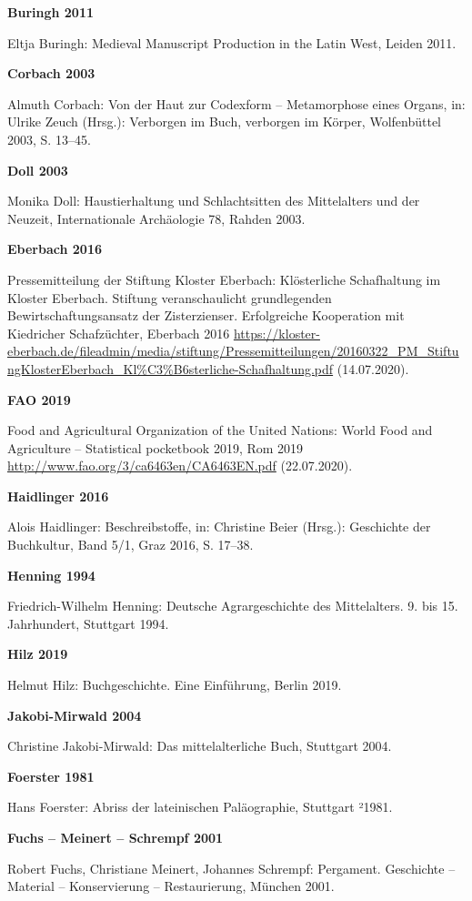 \documentclass[a4paper,
fontsize=11pt,
oneside,
numbers=noperiodatend,
parskip=half-,
bibliography=totoc,
final
]{scrartcl}
\begin{document}
\textbf{Buringh 2011}

Eltja Buringh: Medieval Manuscript Production in the Latin West, Leiden
2011.

\textbf{Corbach 2003}

Almuth Corbach: Von der Haut zur Codexform -- Metamorphose eines Organs,
in: Ulrike Zeuch (Hrsg.): Verborgen im Buch, verborgen im Körper,
Wolfenbüttel 2003, S. 13--45.

\textbf{Doll 2003}

Monika Doll: Haustierhaltung und Schlachtsitten des Mittelalters und der
Neuzeit, Internationale Archäologie 78, Rahden 2003.

\textbf{Eberbach 2016}

Pressemitteilung der Stiftung Kloster Eberbach: Klösterliche
Schafhaltung im Kloster Eberbach. Stiftung veranschaulicht grundlegenden
Bewirtschaftungsansatz der Zisterzienser. Erfolgreiche Kooperation mit
Kiedricher Schafzüchter, Eberbach 2016
\sloppy\url{https://kloster-eberbach.de/fileadmin/media/stiftung/Pressemitteilungen/20160322_PM_StiftungKlosterEberbach_Kl\%C3\%B6sterliche-Schafhaltung.pdf}
(14.07.2020).

\textbf{FAO 2019}

Food and Agricultural Organization of the United Nations: World Food and
Agriculture -- Statistical pocketbook 2019, Rom 2019
\url{http://www.fao.org/3/ca6463en/CA6463EN.pdf} (22.07.2020).

\textbf{Haidlinger 2016}

Alois Haidlinger: Beschreibstoffe, in: Christine Beier (Hrsg.):
Geschichte der Buchkultur, Band 5/1, Graz 2016, S. 17--38.

\textbf{Henning 1994}

Friedrich-Wilhelm Henning: Deutsche Agrargeschichte des Mittelalters. 9.
bis 15. Jahrhundert, Stuttgart 1994.

\textbf{Hilz 2019}

Helmut Hilz: Buchgeschichte. Eine Einführung, Berlin 2019.

\textbf{Jakobi-Mirwald 2004}

Christine Jakobi-Mirwald: Das mittelalterliche Buch, Stuttgart 2004.

\textbf{Foerster 1981}

Hans Foerster: Abriss der lateinischen Paläographie, Stuttgart ²1981.

\textbf{Fuchs -- Meinert -- Schrempf 2001}

Robert Fuchs, Christiane Meinert, Johannes Schrempf: Pergament.
Geschichte -- Material -- Konservierung -- Restaurierung, München 2001.
\end{document}
